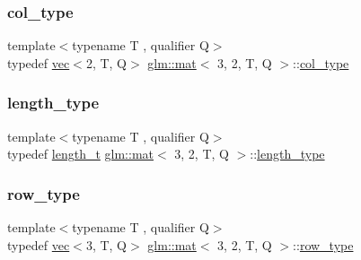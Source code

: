 \subsubsection{\texorpdfstring{col\+\_\+type}{col\_type}}
{\footnotesize\ttfamily template$<$typename T , qualifier Q$>$ \\
typedef \mbox{\hyperlink{structglm_1_1vec}{vec}}$<$2, T, Q$>$ \mbox{\hyperlink{structglm_1_1mat}{glm\+::mat}}$<$ 3, 2, T, Q $>$\+::\mbox{\hyperlink{structglm_1_1mat_3_013_00_012_00_01_t_00_01_q_01_4_aa610dcaaae528e1eea8bdaaa435ad3a4}{col\+\_\+type}}}

\mbox{\label{structglm_1_1mat_3_013_00_012_00_01_t_00_01_q_01_4_ac2f268fa5e899b2a6ad8139183ed61d4}} 
\subsubsection{\texorpdfstring{length\+\_\+type}{length\_type}}
{\footnotesize\ttfamily template$<$typename T , qualifier Q$>$ \\
typedef \mbox{\hyperlink{namespaceglm_a090a0de2260835bee80e71a702492ed9}{length\+\_\+t}} \mbox{\hyperlink{structglm_1_1mat}{glm\+::mat}}$<$ 3, 2, T, Q $>$\+::\mbox{\hyperlink{structglm_1_1mat_3_013_00_012_00_01_t_00_01_q_01_4_ac2f268fa5e899b2a6ad8139183ed61d4}{length\+\_\+type}}}

\mbox{\label{structglm_1_1mat_3_013_00_012_00_01_t_00_01_q_01_4_a0b91ceeaafce26ca1b6b64f8ea34dbb1}} 
\subsubsection{\texorpdfstring{row\+\_\+type}{row\_type}}
{\footnotesize\ttfamily template$<$typename T , qualifier Q$>$ \\
typedef \mbox{\hyperlink{structglm_1_1vec}{vec}}$<$3, T, Q$>$ \mbox{\hyperlink{structglm_1_1mat}{glm\+::mat}}$<$ 3, 2, T, Q $>$\+::\mbox{\hyperlink{structglm_1_1mat_3_013_00_012_00_01_t_00_01_q_01_4_a0b91ceeaafce26ca1b6b64f8ea34dbb1}{row\+\_\+type}}}

